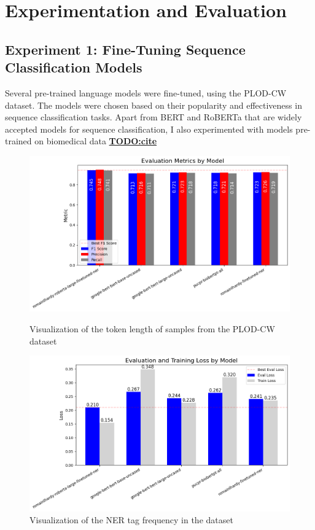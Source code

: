 \documentclass[a4paper,11pt]{article}
\begin{document}
\section{Experimentation and Evaluation}\label{sec:experimentation}
\subsection{Experiment 1: Fine-Tuning Sequence Classification Models}
Several pre-trained language models were fine-tuned, using the PLOD-CW dataset.
The models were chosen based on their popularity and effectiveness in sequence
classification tasks. Apart from BERT and RoBERTa that are widely accepted
models for sequence classification, I also experimented with models pre-trained
on biomedical data \underline{\textbf{TODO:cite}}

\begin{figure}[H]
	\centering
	\begin{minipage}[t]{0.48\textwidth}
		\centering
		\includegraphics[width=\textwidth]{./assets/model_f1.png}
		\caption{Visualization of the token length of samples from the PLOD-CW dataset}\label{fig:model_f1}
	\end{minipage}
	\hfill
	\begin{minipage}[t]{0.48\textwidth}
		\centering
		\includegraphics[width=\textwidth]{./assets/model_train_eval_loss.png}
		\caption{Visualization of the NER tag frequency in the dataset}\label{fig:model_losses}
	\end{minipage}
\end{figure}
\end{document}
